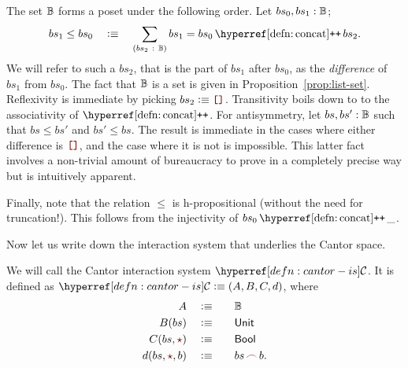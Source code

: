 \begin{defn}\label{defn:cantor-poset}
  The set $\mathbb{B}{}$ forms a poset under the following order. Let
  $bs_0, bs_1:\mathbb{B}{}$;
  \begin{equation*}
    bs_1 \le bs_0 \quad\is\quad \sigmaty{bs_2}{\bitlist{}}{bs_1 = bs_0 \concat bs_2}.
  \end{equation*}
  We will refer to such a $bs_2$, that is the part of $bs_1$ after $bs_0$, as the
  \emph{difference} of $bs_1$ from $bs_0$. The fact that $\mathbb{B}{}$ is a set is
  given in Proposition~\ref{prop:list-set}. Reflexivity is immediate by picking $bs_2 \is
  \emptylist{}$. Transitivity boils down to to the associativity of $\concat$. For
  antisymmetry, let $bs, bs':\mathbb{B}{}$ such that $bs \le bs'$ and $bs' \le
  bs$. The result is immediate in the cases where either difference is $\emptylist$, and
  the case where it is not is impossible. This latter fact involves a non-trivial amount
  of bureaucracy to prove in a completely precise way but is intuitively apparent.

  Finally, note that the relation $\le$ is h-propositional (without the need for
  truncation!). This follows from the injectivity of $bs_0 \concat \_$.
\end{defn}

Now let us write down the interaction system that underlies the Cantor space.
\begin{defn}\label{defn:cantor-is}
  We will call the Cantor interaction system $\cantoris{}$. It is defined as
  $\cantoris{} \is (A, B, C, d)$, where
  \begin{alignat*}{2}
    A                   \quad&\is\quad && \bitlist{}   \\
    B(bs)               \quad&\is\quad && \unitty{}    \\
    C(bs, \unittm{})    \quad&\is\quad && \bool{}      \\
    d(bs, \unittm{}, b) \quad&\is\quad && \snoc{bs}{b} .
  \end{alignat*}
\end{defn}

